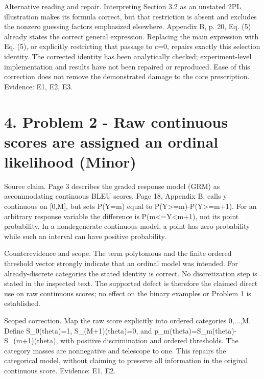 \documentclass[10pt]{article}
\begin{document}
Alternative reading and repair. Interpreting Section 3.2 as an unstated 2PL illustration makes its formula correct, but that restriction is absent and excludes the nonzero guessing factors emphasized elsewhere. Appendix B, p. 20, Eq. (5) already states the correct general expression. Replacing the main expression with Eq. (5), or explicitly restricting that passage to c=0, repairs exactly this selection identity. The corrected identity has been analytically checked; experiment-level implementation and results have not been repaired or reproduced. Ease of this correction does not remove the demonstrated damage to the core prescription. Evidence: E1, E2, E3.\par
\section*{4. Problem 2 - Raw continuous scores are assigned an ordinal likelihood (Minor)}
Source claim. Page 3 describes the graded response model (GRM) as accommodating continuous BLEU scores. Page 18, Appendix B, calls y continuous on [0,M], but sets P(Y=m) equal to P(Y>=m)-P(Y>=m+1). For an arbitrary response variable the difference is P(m<=Y<m+1), not its point probability. In a nondegenerate continuous model, a point has zero probability while such an interval can have positive probability.\par
Counterevidence and scope. The term polytomous and the finite ordered threshold vector strongly indicate that an ordinal model was intended. For already-discrete categories the stated identity is correct. No discretization step is stated in the inspected text. The supported defect is therefore the claimed direct use on raw continuous scores; no effect on the binary examples or Problem 1 is established.\par
Scoped correction. Map the raw score explicitly into ordered categories 0,...,M. Define S\_0(theta)=1, S\_(M+1)(theta)=0, and p\_m(theta)=S\_m(theta)-S\_(m+1)(theta), with positive discrimination and ordered thresholds. The category masses are nonnegative and telescope to one. This repairs the categorical model, without claiming to preserve all information in the original continuous score. Evidence: E1, E2.\par
\end{document}
